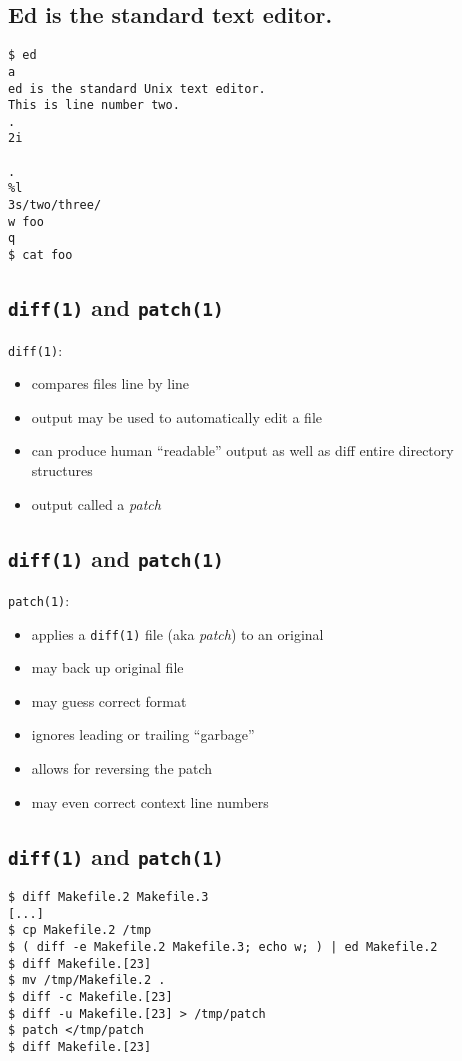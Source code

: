 \documentclass[xga]{xdvislides}
\begin{document}
\subsection{Ed is the standard text editor.}
\begin{verbatim}
$ ed
a
ed is the standard Unix text editor.
This is line number two.
.
2i

.
%l
3s/two/three/
w foo
q
$ cat foo
\end{verbatim}

\subsection{{\tt diff(1)} and {\tt patch(1)}}
{\tt diff(1)}:
\begin{itemize}
	\item compares files line by line
	\item output may be used to automatically edit a file
	\item can produce human ``readable'' output as well as diff entire
		directory structures
	\item output called a {\em patch}
\end{itemize}

\subsection{{\tt diff(1)} and {\tt patch(1)}}
{\tt patch(1)}:
\begin{itemize}
	\item applies a {\tt diff(1)} file (aka {\em patch}) to an original
	\item may back up original file
	\item may guess correct format
	\item ignores leading or trailing ``garbage''
	\item allows for reversing the patch
	\item may even correct context line numbers
\end{itemize}

\subsection{{\tt diff(1)} and {\tt patch(1)}}
\begin{verbatim}
$ diff Makefile.2 Makefile.3
[...]
$ cp Makefile.2 /tmp
$ ( diff -e Makefile.2 Makefile.3; echo w; ) | ed Makefile.2
$ diff Makefile.[23]
$ mv /tmp/Makefile.2 .
$ diff -c Makefile.[23]
$ diff -u Makefile.[23] > /tmp/patch
$ patch </tmp/patch
$ diff Makefile.[23]
\end{verbatim}
\end{document}
